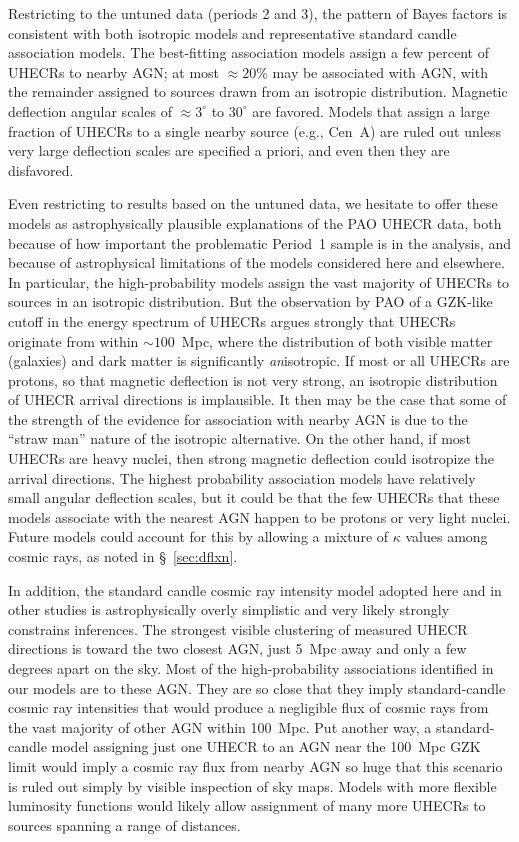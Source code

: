 Restricting to the untuned data (periods 2 and 3), the pattern of Bayes
factors is consistent with both isotropic models and representative standard
candle association models.
The best-fitting association models assign a few percent of UHECRs to nearby
AGN; at most $\approx 20$\% may be associated with AGN, with the remainder
assigned to sources drawn from an isotropic distribution.
Magnetic deflection angular scales of $\approx 3^\circ$
to $30^\circ$ are favored.
Models that assign a large fraction of UHECRs to a single nearby source (e.g.,
Cen~A) are ruled out unless very large deflection scales are specified a
priori, and even then they are disfavored.

Even restricting to results based on the untuned data, we hesitate to offer
these models as astrophysically plausible explanations of the PAO UHECR
data, both because of how important the problematic Period~1 sample is in
the analysis, and because of astrophysical limitations of the models
considered here and elsewhere.  In particular, the high-probability models
assign the vast majority of UHECRs to sources in an isotropic distribution.
But the observation by PAO of a GZK-like cutoff in the energy spectrum of
UHECRs argues strongly that UHECRs originate from within $\sim 100$~Mpc,
where the distribution of both visible matter (galaxies) and dark matter is
significantly {\em an}isotropic.  If most or all UHECRs are protons, so that
magnetic deflection is not very strong, an isotropic distribution of UHECR
arrival directions is implausible.  It then may be the case that some of the
strength of the evidence for association with nearby AGN is due to the
``straw man'' nature of the isotropic alternative.  On the other hand, if
most UHECRs are heavy nuclei, then strong magnetic deflection could
isotropize the arrival directions.  The highest probability association
models have relatively small angular deflection scales, but it could be that
the few UHECRs that these models associate with the nearest AGN happen to be
protons or very light nuclei.  Future models could account for this by
allowing a mixture of $\kappa$ values among cosmic rays, as noted in
\S~\ref{sec:dflxn}.

In addition, the standard candle cosmic ray intensity model adopted here and
in other studies is astrophysically overly simplistic and very likely strongly
constrains inferences.  The strongest visible clustering of measured UHECR
directions is toward the two closest AGN, just 5~Mpc away and only a few
degrees apart on the sky.  Most of the high-probability associations
identified in our models are to these AGN.  They are so close that they
imply standard-candle cosmic ray intensities that would produce a negligible
flux of cosmic rays from the vast majority of other AGN within 100~Mpc.  Put
another way, a standard-candle model assigning just one UHECR to an AGN near
the 100~Mpc GZK limit would imply a cosmic ray flux from nearby AGN so huge
that this scenario is ruled out simply by visible inspection of sky maps. 
Models with more flexible luminosity functions would likely allow assignment
of many more UHECRs to sources spanning a range of distances.

